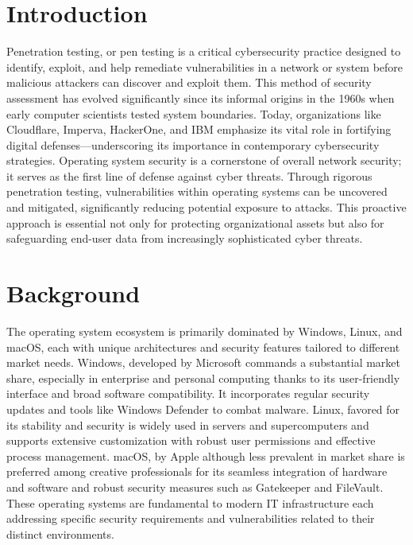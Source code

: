 \documentclass[manuscript,acmsmall,anonymous,review,screen,nonacm=true, authorversion=true]{acmart}
\begin{document}
\section{Introduction}
Penetration testing, or pen testing is a critical cybersecurity practice designed to identify, exploit, and help remediate vulnerabilities in a network or system before malicious attackers can discover and exploit them. This method of security assessment has evolved significantly since its informal origins in the 1960s when early computer scientists tested system boundaries. Today, organizations like Cloudflare, Imperva, HackerOne, and IBM emphasize its vital role in fortifying digital defenses—underscoring its importance in contemporary cybersecurity strategies. Operating system security is a cornerstone of overall network security; it serves as the first line of defense against cyber threats. Through rigorous penetration testing, vulnerabilities within operating systems can be uncovered and mitigated, significantly reducing potential exposure to attacks. This proactive approach is essential not only for protecting organizational assets but also for safeguarding end-user data from increasingly sophisticated cyber threats.

\section{Background}
The operating system ecosystem is primarily dominated by Windows, Linux, and macOS, each with unique architectures and security features tailored to different market needs. Windows, developed by Microsoft commands a substantial market share, especially in enterprise and personal computing thanks to its user-friendly interface and broad software compatibility. It incorporates regular security updates and tools like Windows Defender to combat malware. Linux, favored for its stability and security is widely used in servers and supercomputers and supports extensive customization with robust user permissions and effective process management. macOS, by Apple although less prevalent in market share is preferred among creative professionals for its seamless integration of hardware and software and robust security measures such as Gatekeeper and FileVault. These operating systems are fundamental to modern IT infrastructure each addressing specific security requirements and vulnerabilities related to their distinct environments.
\end{document}
